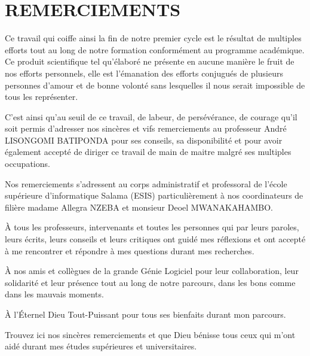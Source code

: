 \chapter*{REMERCIEMENTS}
    Ce travail qui coiffe ainsi la fin de notre premier cycle est le
    résultat de multiples efforts tout au long de notre formation conformément
    au programme académique. Ce produit scientifique tel qu’élaboré ne présente
    en aucune manière le fruit de nos efforts personnels, elle est l’émanation
    des efforts conjugués de plusieurs personnes d’amour et de bonne volonté
    sans lesquelles il nous serait impossible de tous les représenter.
    \par
    C’est ainsi qu’au seuil de ce travail, de labeur, de persévérance,
    de courage qu’il soit permis d’adresser nos sincères et vifs remerciements 
    au professeur André LISONGOMI BATIPONDA pour ses conseils, sa disponibilité et pour avoir également accepté
    de diriger ce travail de main de maitre malgré ses multiples occupations.
    \par
    Nos remerciements s’adressent au corps administratif et professoral de l’école supérieure d’informatique
    Salama (ESIS) particulièrement à nos coordinateurs de filière madame Allegra NZEBA et monsieur Deoel MWANAKAHAMBO. %
    \par
    À tous les professeurs, intervenants et toutes les
    personnes qui par leurs paroles, leurs écrits, leurs conseils et leurs critiques ont guidé mes réflexions
    et ont accepté à me rencontrer et répondre à mes questions durant mes recherches. 
    \par
    À nos amis et collègues de la  grande Génie Logiciel
    pour leur collaboration, leur solidarité et leur présence tout au long de notre
    parcours, dans les bons comme dans les mauvais moments.
    \par
    À l’Éternel Dieu Tout-Puissant pour tous ses bienfaits durant mon parcours.
    \par
    Trouvez ici nos sincères remerciements et que Dieu bénisse tous ceux qui m’ont aidé durant mes études supérieures et
    universitaires.